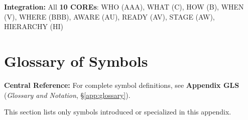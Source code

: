 \begin{tcolorbox}[colback=green!10!white, colframe=green!75!black,
    title=\textbf{Appendix HHH: Summary (v2.0 --- Emergent Intervention Theory)}]
\textbf{Integration:} All \textbf{10 COREs}: WHO (AAA), WHAT (C), HOW (B), WHEN (V), WHERE (BBB), AWARE (AU), READY (AV), STAGE (AW), HIERARCHY (HI)

\end{tcolorbox}


\section{Glossary of Symbols}
\label{sec:hhh-glossary}

\begin{tcolorbox}[colback=blue!5!white, colframe=blue!75!black]
\textbf{Central Reference:} For complete symbol definitions, see
\textbf{Appendix GLS} (\textit{Glossary and Notation}, \S\ref{app:glossary}).

This section lists only symbols introduced or specialized in this appendix.
\end{tcolorbox}

\vspace{0.5em}

